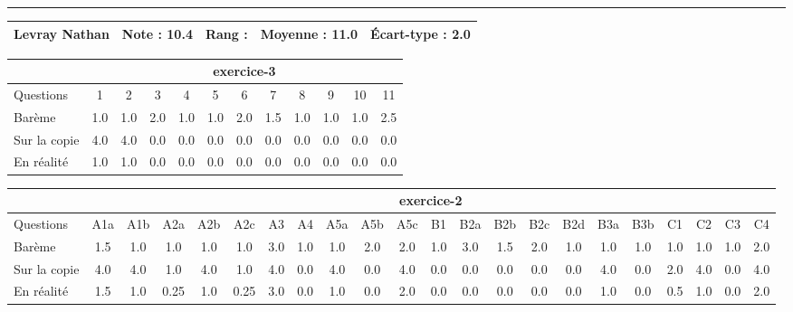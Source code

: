 \documentclass[a4paper, landscape, 10pt]{article}
\begin{document}
\begin{minipage}{\textwidth}
  \end{minipage}
  \vspace{0.3cm}
  \hrule
  \vspace{0.3cm}

  \begin{minipage}{\textwidth}
    { \bf
    \begin{tabular}{|c|*{4}{c|}}
    \hline
      Levray Nathan & Note : 10.4 & Rang :  & Moyenne : 11.0 & \'Ecart-type : 2.0 \\
    \hline
    \end{tabular}
    }
    
      \begin{tabular}{|l|*{ 11 }{c|}}
        \hline
        & \multicolumn{ 11 }{c|}{ exercice-3 } \\
        \hline
        Questions & 1&2&3&4&5&6&7&8&9&10&11 \\
        \hline
        Barème & 1.0&1.0&2.0&1.0&1.0&2.0&1.5&1.0&1.0&1.0&2.5 \\
        \hline
        Sur la copie & 4.0&4.0&0.0&0.0&0.0&0.0&0.0&0.0&0.0&0.0&0.0 \\
        \hline
        En réalité & 1.0&1.0&0.0&0.0&0.0&0.0&0.0&0.0&0.0&0.0&0.0 \\
        \hline
      \end{tabular}
    
      \begin{tabular}{|l|*{ 21 }{c|}}
        \hline
        & \multicolumn{ 21 }{c|}{ exercice-2 } \\
        \hline
        Questions & A1a&A1b&A2a&A2b&A2c&A3&A4&A5a&A5b&A5c&B1&B2a&B2b&B2c&B2d&B3a&B3b&C1&C2&C3&C4 \\
        \hline
        Barème & 1.5&1.0&1.0&1.0&1.0&3.0&1.0&1.0&2.0&2.0&1.0&3.0&1.5&2.0&1.0&1.0&1.0&1.0&1.0&1.0&2.0 \\
        \hline
        Sur la copie & 4.0&4.0&1.0&4.0&1.0&4.0&0.0&4.0&0.0&4.0&0.0&0.0&0.0&0.0&0.0&4.0&0.0&2.0&4.0&0.0&4.0 \\
        \hline
        En réalité & 1.5&1.0&0.25&1.0&0.25&3.0&0.0&1.0&0.0&2.0&0.0&0.0&0.0&0.0&0.0&1.0&0.0&0.5&1.0&0.0&2.0 \\
        \hline
      \end{tabular}
    

\end{minipage}
\end{document}
